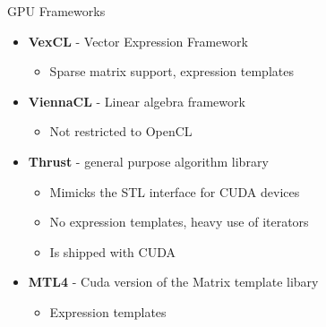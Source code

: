 \documentclass{beamer}
\newcommand{\heading}[1]{\centerline{\Large #1} \vspace{0.5em}}
\begin{document}
\begin{frame}[fragile]
 \heading{GPU Frameworks}

\begin{itemize}
 \item \textbf{VexCL} - Vector Expression Framework
   \begin{itemize} \item Sparse matrix support, expression templates \end{itemize}
\end{itemize}
\begin{itemize}
 \item \textbf{ViennaCL} - Linear algebra framework 
   \begin{itemize} \item Not restricted to OpenCL \end{itemize}
\end{itemize}
\begin{itemize}
 \item \textbf{Thrust} - general purpose algorithm library
   \begin{itemize} \item Mimicks the STL interface for CUDA devices \item No expression templates, heavy use of iterators \item Is shipped with CUDA \end{itemize}
\end{itemize}
\begin{itemize}
 \item \textbf{MTL4} - Cuda version of the Matrix template libary
   \begin{itemize} \item Expression templates \end{itemize}
\end{itemize}

\end{frame}
\end{document}
